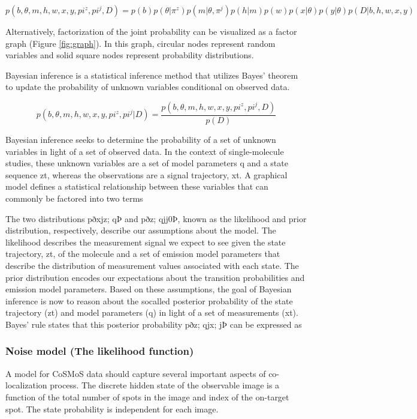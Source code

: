 \textbf{\begin{equation*}
    p(b,\theta,m,h,w,x,y,pi^z,pi^j,D) = p(b)p(\theta|\pi^z)p(m|\theta,\pi^j)p(h|m)p(w)p(x|\theta)p(y|\theta)p(D|b,h,w,x,y)
\end{equation*}}

Alternatively, factorization of the joint probability can be visualized as a factor graph (Figure \ref{fig:graph}). In this graph, circular nodes represent random variables and solid square nodes represent probability distributions.

Bayesian inference is a statistical inference method that utilizes Bayes' theorem to update the probability of unknown variables conditional on observed data.

\textbf{\begin{equation*}
    p(b,\theta,m,h,w,x,y,pi^z,pi^j|D) = 
    \dfrac{p(b,\theta,m,h,w,x,y,pi^z,pi^j,D)}{p(D)}
\end{equation*}}

Bayesian inference seeks to determine the probability of a set of unknown
variables in light of a set of observed data. In the context of single-molecule
studies, these unknown variables are a set of model parameters q and a state
sequence zt, whereas the observations are a signal trajectory, xt. A graphical
model defines a statistical relationship between these variables that can
commonly be factored into two terms

The two distributions pðxjz; qÞ and pðz; qjj0Þ, known as the likelihood and
prior distribution, respectively, describe our assumptions about the model.
The likelihood describes the measurement signal we expect to see given
the state trajectory, zt, of the molecule and a set of emission model parameters that describe the distribution of measurement values associated
with each state. The prior distribution encodes our expectations about the
transition probabilities and emission model parameters. Based on these assumptions, the goal of Bayesian inference is now to reason about the socalled posterior probability of the state trajectory (zt) and model parameters
(q) in light of a set of measurements (xt). Bayes’ rule states that this posterior probability pðz; qjx; jÞ can be expressed as

\subsubsection{Noise model (The likelihood function)}

A model for CoSMoS data should capture several important aspects of co-localization process. The discrete hidden state of the observable image is a function of the total number of spots in the image and index of the on-target spot. The state probability is independent for each image.


